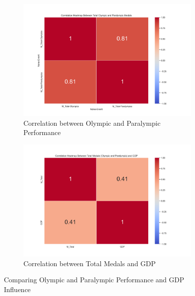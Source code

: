 \documentclass{article}
\begin{document}
\begin{figure}[h]
    \centering
    \begin{subfigure}[b]{0.45\textwidth}
        \centering
        \includegraphics[width=\linewidth]{images/gdp_analysis/heatmap_olympics_paralympics_medals.png}
        \caption{Correlation between Olympic and Paralympic Performance}
        \label{fig:olympic_paralympic_corr}
    \end{subfigure}
    \hfill
    \begin{subfigure}[b]{0.45\textwidth}
        \centering
        \includegraphics[width=\linewidth]{images/gdp_analysis/heatmap_total_medals_gdp.png}
        \caption{Correlation between Total Medals and GDP}
        \label{fig:medal_gdp_corr}
    \end{subfigure}
    \caption{Comparing Olympic and Paralympic Performance and GDP Influence}
    \label{fig:sidebyside_corr}
\end{figure}
\end{document}
